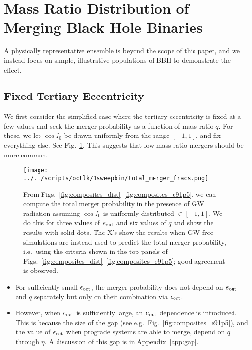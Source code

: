 \documentclass[
        fleqn,
        usenatbib,
    ]{mnras}
\begin{document}
\section{Mass Ratio Distribution of Merging Black Hole Binaries}

A physically representative ensemble is beyond the scope of this paper, and we
instead focus on simple, illustrative populations of BBH to demonstrate the
effect.

\subsection{Fixed Tertiary Eccentricity}

We first consider the simplified case where the tertiary eccentricity is fixed
at a few values and seek the merger probability as a function of mass ratio $q$.
For these, we let $\cos I_0$ be drawn uniformly from the range $[-1, 1]$, and
fix everything else. See Fig.~\ref{fig:total_merger_fracs}. This suggests that
low mass ratio mergers should be more common.
\begin{figure*}
    \centering
    \texttt{[image: ../../scripts/octlk/1sweepbin/total\_merger\_fracs.png]}
    \caption{From Figs.~\ref{fig:composites_dist}--\ref{fig:composites_e91p5},
    we can compute the total merger probability in the presence of GW radiation
    assuming $\cos I_0$ is uniformly distributed $\in [-1, 1]$. We do this for
    three values of $e_{\rm out}$ and six values of $q$ and show the results
    with solid dots. The X's show the results when GW-free simulations are
    instead used to predict the total merger probability, i.e.\ using the
    criteria shown in the top panels of
    Figs.~\ref{fig:composites_dist}--\ref{fig:composites_e91p5}; good agreement
    is observed. }\label{fig:total_merger_fracs}
\end{figure*}
\begin{itemize}
    \item For sufficiently small $\epsilon_{\rm oct}$, the merger probability
        does not depend on $e_{\rm out}$ and $q$ separately but only on their
        combination via $\epsilon_{\rm oct}$.

    \item However, when $\epsilon_{\rm oct}$ is sufficiently large, an $e_{\rm
        out}$ dependence is introduced. This is because the size of the gap (see
        e.g.\ Fig.~\ref{fig:composites_e91p5}), and the value of $\epsilon_{\rm
        oct}$ when prograde systems are able to merge, depend on $q$ through
        $\eta$. A discussion of this gap is in Appendix~\ref{app:gap}.
\end{itemize}
\end{document}
